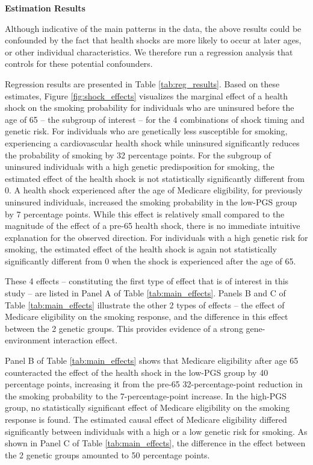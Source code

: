 \documentclass[12pt]{article}
\begin{document}
\noindent \textbf{\textsf{\textcolor{NavyBlue}{Estimation Results}}}

\noindent Although indicative of the main patterns in the data, the above results could be confounded by the fact that health shocks are more likely to occur at later ages, or other individual characteristics. We therefore run a regression analysis that controls for these potential confounders.

Regression results are presented in Table \ref{tab:reg_results}. Based on these estimates, Figure \ref{fig:shock_effects} visualizes the marginal effect of a health shock on the smoking probability for individuals who are uninsured before the age of 65 -- the subgroup of interest -- for the 4 combinations of shock timing and genetic risk. For individuals who are genetically less susceptible for smoking, experiencing a cardiovascular health shock while uninsured significantly reduces the probability of smoking by 32 percentage points. For the subgroup of uninsured individuals with a high genetic predisposition for smoking, the estimated effect of the health shock is not statistically significantly different from 0. A health shock experienced after the age of Medicare eligibility, for previously uninsured individuals, increased the smoking probability in the low-PGS group by 7 percentage points. While this effect is relatively small compared to the magnitude of the effect of a pre-65 health shock, there is no immediate intuitive explanation for the observed direction. For individuals with a high genetic risk for smoking, the estimated effect of the health shock is again not statistically significantly different from 0 when the shock is experienced after the age of 65.

These 4 effects -- constituting the first type of effect that is of interest in this study -- are listed in Panel A of Table \ref{tab:main_effects}. Panels B and C of Table \ref{tab:main_effects} illustrate the other 2 types of effects -- the effect of Medicare eligibility on the smoking response, and the difference in this effect between the 2 genetic groups. This provides evidence of a strong gene-environment interaction effect.


Panel B of Table \ref{tab:main_effects} shows that Medicare eligibility after age 65 counteracted the effect of the health shock in the low-PGS group by 40 percentage points, increasing it from the pre-65 32-percentage-point reduction in the smoking probability to the 7-percentage-point increase. In the high-PGS group, no statistically significant effect of Medicare eligibility on the smoking response is found. The estimated causal effect of Medicare eligibility differed significantly between individuals with a high or a low genetic risk for smoking. As shown in Panel C of Table \ref{tab:main_effects}, the difference in the effect between the 2 genetic groups amounted to 50 percentage points.
\end{document}
